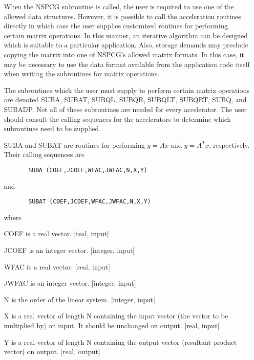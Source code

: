     When the NSPCG subroutine is called, the user is required to use
one of the allowed data structures.  However, it is possible to call
the acceleration routines directly in which case the user supplies
customized routines for performing certain matrix operations.  In
this manner, an iterative algorithm can be designed which is suitable
to a particular application.  Also, storage demands may preclude
copying the matrix into one of NSPCG's allowed matrix formats.
In this case, it may be necessary to use the data format available
from the application code itself when writing the subroutines for
matrix operations.
 
   The subroutines which the user must supply to perform certain
matrix operations are denoted SUBA, SUBAT, SUBQL, SUBQR, SUBQLT,
SUBQRT, SUBQ, and SUBADP.  Not all of these subroutines are needed
for every accelerator.  The user should consult the calling sequences
for the accelerators to determine which subroutines need to be supplied.  

   SUBA and SUBAT are routines for performing $y=Ax$ and $y=A^Tx$, 
respectively.  Their calling sequences are
\begin{verbatim}
       SUBA (COEF,JCOEF,WFAC,JWFAC,N,X,Y) 
\end{verbatim}
and
\begin{verbatim}
       SUBAT (COEF,JCOEF,WFAC,JWFAC,N,X,Y) 
\end{verbatim}
where
 
\bigskip
\begin{list}{}{
               \leftmargin 1.00in \rightmargin 0.25in}
 \item[COEF \hfill] is a real vector.  [real, input]
 
 \item[JCOEF \hfill] is an integer vector.  [integer, input]
 
 \item[WFAC \hfill] is a real vector. [real, input]
 
 \item[JWFAC \hfill] is an integer vector.  [integer, input]
 
 \item[N \hfill] is the order of the linear system. [integer, input]
 
 \item[X \hfill] is a real vector of length N containing the
           input vector (the vector to be multiplied by) on input.
           It should be unchanged on output. [real, input]
 
 \item[Y \hfill] is a real vector of length N containing the
           output vector (resultant product vector) on output.
           [real, output]
\end{list}
 
